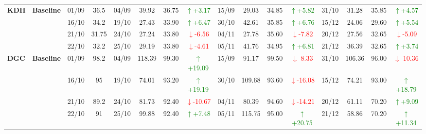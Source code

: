 \documentclass{ieeeaccess}
\begin{document}
{\begin{longtable}{llcc|cccc|cccc|cccc}
\multirow{4}{*}{\textbf{KDH}}
& \textbf{Baseline}
& 01/09 & 36.5 & 04/09 & 39.92 & 36.75 & \textcolor{green}{\(\uparrow\)+3.17} & 15/09 & 29.03 & 34.85 & \textcolor{green}{\(\uparrow\)+5.82} & 31/10 & 31.28 & 35.85 & \textcolor{green}{\(\uparrow\)+4.57} \\
& & 16/10 & 34.2 & 19/10 & 27.43 & 33.90 & \textcolor{green}{\(\uparrow\)+6.47} & 30/10 & 42.61 & 35.85 & \textcolor{green}{\(\uparrow\)+6.76} & 15/12 & 24.06 & 29.60 & \textcolor{green}{\(\uparrow\)+5.54} \\
& & 21/10 & 31.75 & 24/10 & 27.24 & 33.80 & \textcolor{red}{\(\downarrow\)-6.56} & 04/11 & 27.78 & 35.60 & \textcolor{red}{\(\downarrow\)-7.82} & 20/12 & 27.56 & 32.65 & \textcolor{red}{\(\downarrow\)-5.09} \\
& & 22/10 & 32.2 & 25/10 & 29.19 & 33.80 & \textcolor{red}{\(\downarrow\)-4.61} & 05/11 & 41.76 & 34.95 & \textcolor{green}{\(\uparrow\)+6.81} & 21/12 & 36.39 & 32.65 & \textcolor{green}{\(\uparrow\)+3.74} \\
\midrule

\multirow{4}{*}{\textbf{DGC}}
& \textbf{Baseline}
& 01/09 & 98.2 & 04/09 & 118.39 & 99.30 & \textcolor{green}{\(\uparrow\)+19.09} & 15/09 & 91.17 & 99.50 & \textcolor{red}{\(\downarrow\)-8.33} & 31/10 & 106.36 & 96.00 & \textcolor{red}{\(\downarrow\)-10.36} \\
& & 16/10 & 95 & 19/10 & 74.01 & 93.20 & \textcolor{green}{\(\uparrow\)+19.19} & 30/10 & 109.68 & 93.60 & \textcolor{red}{\(\downarrow\)-16.08} & 15/12 & 74.21 & 93.00 & \textcolor{green}{\(\uparrow\)+18.79} \\
& & 21/10 & 89.2 & 24/10 & 81.73 & 92.40 & \textcolor{red}{\(\downarrow\)-10.67} & 04/11 & 80.39 & 94.60 & \textcolor{red}{\(\downarrow\)-14.21} & 20/12 & 61.11 & 70.20 & \textcolor{green}{\(\uparrow\)+9.09} \\
& & 22/10 & 91 & 25/10 & 99.88 & 92.40 & \textcolor{green}{\(\uparrow\)+7.48} & 05/11 & 115.75 & 95.00 & \textcolor{green}{\(\uparrow\)+20.75} & 21/12 & 58.86 & 70.20 & \textcolor{green}{\(\uparrow\)+11.34} \\
\midrule


\end{longtable}}
\end{document}
